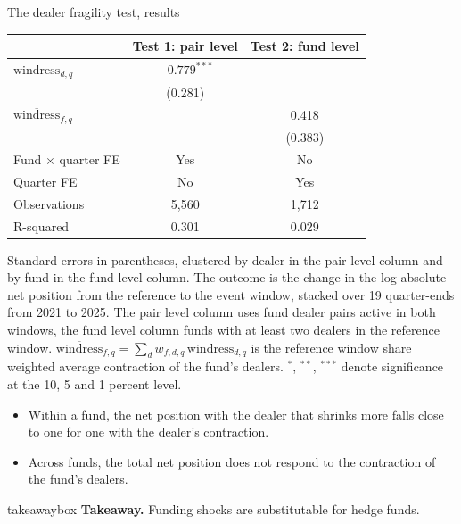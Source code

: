 \documentclass[aspectratio=169,11pt]{beamer}
\newcommand{\takeaway}[1]{%
  \begin{beamercolorbox}[sep=0.6em,wd=\textwidth]{takeawaybox}
    \textbf{Takeaway.} #1
  \end{beamercolorbox}}
\begin{document}
\begin{frame}{The dealer fragility test, results}
  \begin{center}\scriptsize
  \begin{tabular}{lcc}
    \toprule
    & Test 1: pair level & Test 2: fund level \\
    \midrule
    $\mathrm{windress}_{d,q}$ & $-0.779^{***}$ & \\
     & (0.281) & \\
    $\overline{\mathrm{windress}}_{f,q}$ & & 0.418 \\
     & & (0.383) \\
    \midrule
    Fund $\times$ quarter FE & Yes & No \\
    Quarter FE & No & Yes \\
    Observations & 5,560 & 1,712 \\
    R-squared & 0.301 & 0.029 \\
    \bottomrule
  \end{tabular}
  \end{center}
  \vspace{-0.6em}
  {\tiny\color{slate} Standard errors in parentheses, clustered by dealer in the pair level column and by fund in the fund level column. The outcome is the change in the log absolute net position from the reference to the event window, stacked over 19 quarter-ends from 2021 to 2025. The pair level column uses fund dealer pairs active in both windows, the fund level column funds with at least two dealers in the reference window. $\overline{\mathrm{windress}}_{f,q} = \sum_d w_{f,d,q}\,\mathrm{windress}_{d,q}$ is the reference window share weighted average contraction of the fund's dealers. $^{*}$, $^{**}$, $^{***}$ denote significance at the 10, 5 and 1 percent level.\par}
  \smallskip
  \begin{itemize}\small
    \item Within a fund, the net position with the dealer that shrinks more falls close to one for one with the dealer's contraction.
    \item Across funds, the total net position does not respond to the contraction of the fund's dealers.
  \end{itemize}
  \takeaway{Funding shocks are substitutable for hedge funds.}
\end{frame}


\end{document}
